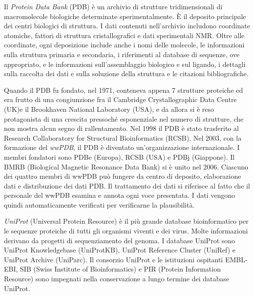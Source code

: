 Il \textit{Protein Data Bank }(PDB) è un archivio di strutture tridimensionali di macromolecole biologiche determinate sperimentalmente. È il deposito principale dei centri biologici di struttura. I dati contenuti nell'archivio includono coordinate atomiche, fattori di struttura cristallografici e dati sperimentali NMR. Oltre alle coordinate, ogni deposizione include anche i nomi delle molecole, le informazioni sulla struttura primaria e secondaria, i riferimenti al database di sequenze, ove appropriato, e le informazioni sull'assemblaggio biologico e sul ligando, i dettagli sulla raccolta dei dati e sulla soluzione della struttura e le citazioni bibliografiche. 

\par Quando il PDB fu fondato, nel 1971, conteneva appena 7 strutture proteiche ed era frutto di una congiunzione fra il Cambridge Crystallographic Data Centre (UK)e il Brookhaven National Laboratory (USA), e da allora si è reso protagonista di una crescita pressoché esponenziale nel numero di strutture, che non mostra alcun segno di rallentamento. Nel 1998 il PDB è stato trasferito al Research Collaboratory for Structural Bioinformatics (RCSB). Nel 2003, con la formazione del \textit{wwPDB}, il PDB è diventato un'organizzazione internazionale.  I membri fondatori sono PDBe (Europa), RCSB (USA) e PDBj (Giappone). Il BMRB (Biological Magnetic Resonance Data Bank) si è unito nel 2006. Ciascuno dei quattro membri di wwPDB può fungere da centro di deposito, elaborazione dati e distribuzione dei dati PDB.  Il trattamento dei dati si riferisce al fatto che il personale del wwPDB esamina e annota ogni voce presentata. I dati vengono quindi automaticamente verificati per verificarne la plausibilità.\\

\par \textit{UniProt} (Universal Protein Resource) è il più grande database bioinformatico per le sequenze proteiche di tutti gli organismi viventi e dei virus. Molte informazioni derivano da progetti di sequenziamento del genoma. I database UniProt sono UniProt Knowledgebase (UniProtKB), UniProt Reference Cluster (UniRef) e UniProt Archive (UniParc). Il consorzio UniProt e le istituzioni ospitanti EMBL-EBI, SIB (Swiss Institute of Bioinformatics) e PIR (Protein Information Resource) sono impegnati nella conservazione a lungo termine dei database UniProt.

